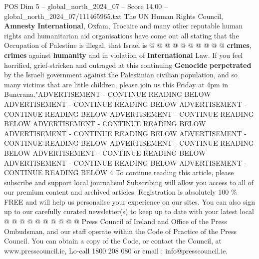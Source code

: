 \begin{textsample}{POS Dim 5 – global\_north\_2024\_07 – Score 14.00 – global\_north\_2024\_07/111465965.txt}
The UN Human Rights Council, \textbf{Amnesty} \textbf{International}, Oxfam, Trocaire and many other reputable human rights and humanitarian aid organisations have come out all stating that the Occupation of Palestine is illegal, that Israel is @ @ @ @ @ @ @ @ @ @ \textbf{crimes}, \textbf{crimes} against \textbf{humanity} and in violation of \textbf{International} Law.
If you feel horrified, grief-stricken and outraged at this continuing \textbf{Genocide} \textbf{perpetrated} by the Israeli government against the Palestinian civilian population, and so many victims that are little children, please join us this Friday at 4pm in Buncrana."ADVERTISEMENT - CONTINUE READING BELOW ADVERTISEMENT - CONTINUE READING BELOW ADVERTISEMENT - CONTINUE READING BELOW ADVERTISEMENT - CONTINUE READING BELOW ADVERTISEMENT - CONTINUE READING BELOW ADVERTISEMENT - CONTINUE READING BELOW ADVERTISEMENT - CONTINUE READING BELOW ADVERTISEMENT - CONTINUE READING BELOW ADVERTISEMENT - CONTINUE READING BELOW ADVERTISEMENT - CONTINUE READING BELOW ADVERTISEMENT - CONTINUE READING BELOW 4 To continue reading this article, please subscribe and support local journalism!
Subscribing will allow you access to all of our premium content and archived articles.
Registration is absolutely 100 \% FREE and will help us personalise your experience on our sites.
You can also sign up to our carefully curated newsletter(s) to keep up to date with your latest local @ @ @ @ @ @ @ @ @ @ Press Council of Ireland and Office of the Press Ombudsman, and our staff operate within the Code of Practice of the Press Council.
You can obtain a copy of the Code, or contact the Council, at www.presscouncil.ie, Lo-call 1800 208 080 or email : info@presscouncil.ie.

\end{textsample}
